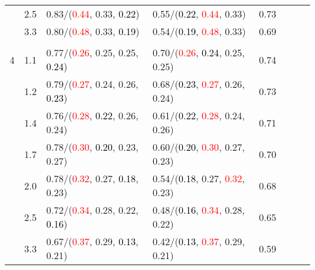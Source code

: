 \documentclass[10pt,a4paper]{report}
\begin{document}
\begin{table}[!htbp]
\begin{center}
{\begin{tabular}{ccllcccc}
			&2.5&0.83/(\textcolor{red}{0.44}, 0.33, \textcolor{black}{0.22})&0.55/(\textcolor{black}{0.22}, \textcolor{red}{0.44}, 0.33)&0.73\\
			&3.3&0.80/(\textcolor{red}{0.48}, 0.33, \textcolor{black}{0.19})&0.54/(\textcolor{black}{0.19}, \textcolor{red}{0.48}, 0.33)&0.69\\
			&&&&\\
			4			&1.1&0.77/(\textcolor{red}{0.26}, 0.25, 0.25, \textcolor{black}{0.24})&0.70/(\textcolor{red}{0.26}, \textcolor{black}{0.24}, 0.25, 0.25)&0.74\\
			&1.2&0.79/(\textcolor{red}{0.27}, 0.24, 0.26, \textcolor{black}{0.23})&0.68/(\textcolor{black}{0.23}, \textcolor{red}{0.27}, 0.26, 0.24)&0.73\\
			&1.4&0.76/(\textcolor{red}{0.28}, \textcolor{black}{0.22}, 0.26, 0.24)&0.61/(\textcolor{black}{0.22}, \textcolor{red}{0.28}, 0.24, 0.26)&0.71\\
			&1.7&0.78/(\textcolor{red}{0.30}, \textcolor{black}{0.20}, 0.23, 0.27)&0.60/(\textcolor{black}{0.20}, \textcolor{red}{0.30}, 0.27, 0.23)&0.70\\
			&2.0&0.78/(\textcolor{red}{0.32}, 0.27, \textcolor{black}{0.18}, 0.23)&0.54/(\textcolor{black}{0.18}, 0.27, \textcolor{red}{0.32}, 0.23)&0.68\\
			&2.5&0.72/(\textcolor{red}{0.34}, 0.28, 0.22, \textcolor{black}{0.16})&0.48/(\textcolor{black}{0.16}, \textcolor{red}{0.34}, 0.28, 0.22)&0.65\\
			&3.3&0.67/(\textcolor{red}{0.37}, 0.29, \textcolor{black}{0.13}, 0.21)&0.42/(\textcolor{black}{0.13}, \textcolor{red}{0.37}, 0.29, 0.21)&0.59\\
			\bottomrule
		\end{tabular}}
	\end{center}
\end{table}
\end{document}
